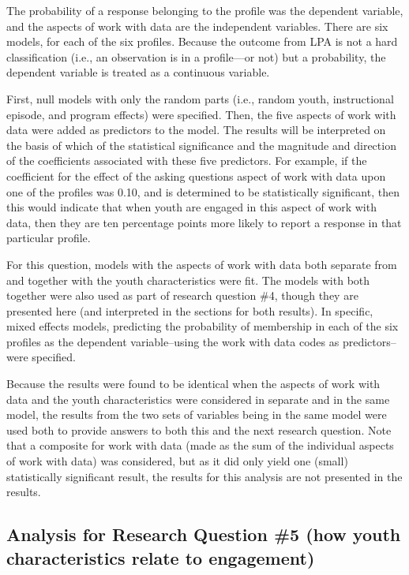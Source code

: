 \documentclass[]{msu-thesis}
\theoremstyle{definition}
\theoremstyle{definition}
\theoremstyle{definition}
\theoremstyle{remark}
\begin{document}
The probability of a response belonging to the profile was the dependent
variable, and the aspects of work with data are the independent
variables. There are six models, for each of the six profiles. Because
the outcome from LPA is not a hard classification (i.e., an observation
is in a profile---or not) but a probability, the dependent variable is
treated as a continuous variable.

First, null models with only the random parts (i.e., random youth,
instructional episode, and program effects) were specified. Then, the
five aspects of work with data were added as predictors to the model.
The results will be interpreted on the basis of which of the statistical
significance and the magnitude and direction of the coefficients
associated with these five predictors. For example, if the coefficient
for the effect of the asking questions aspect of work with data upon one
of the profiles was 0.10, and is determined to be statistically
significant, then this would indicate that when youth are engaged in
this aspect of work with data, then they are ten percentage points more
likely to report a response in that particular profile.

For this question, models with the aspects of work with data both
separate from and together with the youth characteristics were fit. The
models with both together were also used as part of research question
\#4, though they are presented here (and interpreted in the sections for
both results). In specific, mixed effects models, predicting the
probability of membership in each of the six profiles as the dependent
variable--using the work with data codes as predictors--were specified.

Because the results were found to be identical when the aspects of work
with data and the youth characteristics were considered in separate and
in the same model, the results from the two sets of variables being in
the same model were used both to provide answers to both this and the
next research question. Note that a composite for work with data (made
as the sum of the individual aspects of work with data) was considered,
but as it did only yield one (small) statistically significant result,
the results for this analysis are not presented in the results.

\subsection{Analysis for Research Question \#5 (how youth
characteristics relate to
engagement)}\label{analysis-for-research-question-5-how-youth-characteristics-relate-to-engagement}
\end{document}
